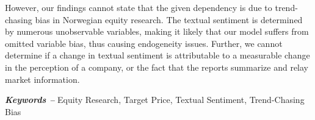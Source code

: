 However, our findings cannot state that the given dependency is due to trend-chasing bias in Norwegian equity research. The textual sentiment is determined by numerous unobservable variables, making it likely that our model suffers from omitted variable bias, thus causing endogeneity issues. Further, we cannot determine if a change in textual sentiment is attributable to a measurable change in the perception of a company, or the fact that the reports summarize and relay market information. %


\par\vspace*{\fill} %
\textbf{\textit{Keywords --}} Equity Research, Target Price, Textual Sentiment, Trend-Chasing Bias %


